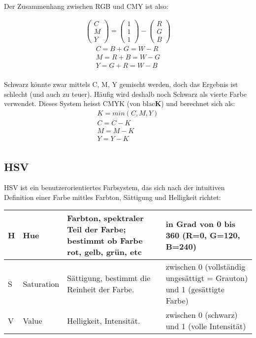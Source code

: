 Der Zusammenhang zwischen RGB und CMY ist also:

\begin{gather*}
\begin{pmatrix} C \\ M \\ Y \end{pmatrix} = 
\begin{pmatrix} 1 \\ 1 \\ 1 \end{pmatrix} -
\begin{pmatrix} R \\ G \\ B \end{pmatrix}
\end{gather*}
\begin{gather*}
C = B + G = W - R \\
M = R + B = W - G \\
Y = G + R = W - B \\
\end{gather*}

\noindent
Schwarz könnte zwar mittels C, M, Y gemischt werden, doch das Ergebnis ist schlecht (und auch zu teuer). Häufig wird deshalb noch Schwarz als vierte Farbe verwendet. Dieses System heisst CMYK (von blac\textbf{K}) und berechnet sich als:
\begin{gather*}
K = min(C, M, Y )\\
C = C - K \\
M = M - K \\
Y = Y - K \\
\end{gather*}

\subsection{HSV} 
HSV ist ein benutzerorientiertes Farbsystem, das sich nach der intuitiven Definition einer Farbe mittles Farbton, Sättigung und Helligkeit richtet:
\begin{center}
\begin{tabular}{ | l | l | p{7cm} | p{6cm} |}
\hline
H & Hue        & Farbton, spektraler Teil der Farbe; bestimmt ob Farbe rot, gelb, grün, etc & in Grad von 0 bis 360  (R=0, G=120, B=240)                              \\ \hline
S & Saturation & Sättigung, bestimmt die Reinheit der Farbe.                                & zwischen 0 (vollständig ungesättigt = Grauton) und 1 (gesättigte Farbe) \\ \hline
V & Value      & Helligkeit, Intensität.                                                    & zwischen 0 (schwarz) und 1 (volle Intensität)   \\     
\hline
\end{tabular}
\end{center}


